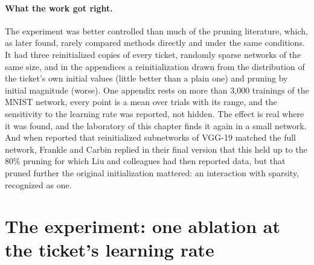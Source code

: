 \begin{refsection}
\paragraph{What the work got right.} The experiment was better controlled than much of the pruning literature, which, as \textcite{BlalockEtAl2020} later found, rarely compared methods directly and under the same conditions. It had three reinitialized copies of every ticket, randomly sparse networks of the same size, and in the appendices a reinitialization drawn from the distribution of the ticket's own initial values (little better than a plain one) and pruning by initial magnitude (worse). One appendix rests on more than 3,000 trainings of the MNIST network, every point is a mean over trials with its range, and the sensitivity to the learning rate was reported, not hidden. The effect is real where it was found, and the laboratory of this chapter finds it again in a small network. And when \textcite{LiuEtAl2019} reported that reinitialized subnetworks of VGG-19 matched the full network, Frankle and Carbin replied in their final version that this held up to the 80\% pruning for which Liu and colleagues had then reported data, but that pruned further the original initialization mattered: an interaction with sparsity, recognized as one.

\section{The experiment: one ablation at the ticket's learning rate}\label{sec:ablations:experiment}

\begin{experiment}
\end{experiment}


\end{refsection}
